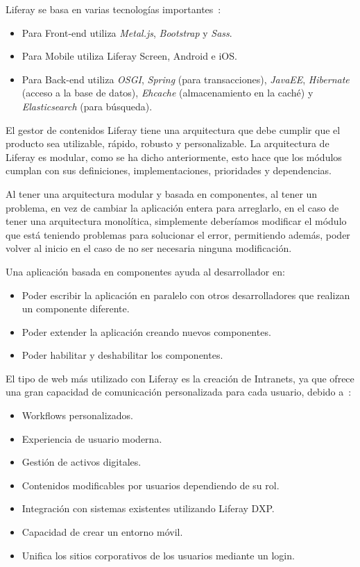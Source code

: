 \documentclass[a4paper, 12pt]{book}
\begin{document}
\vspace{5mm}
Liferay se basa en varias tecnologías importantes~\cite{liferay_dev_tutorials}:

\begin{itemize}
\item Para Front-end utiliza\textit{ Metal.js}, \textit{Bootstrap} y \textit{Sass}.
\item Para Mobile utiliza Liferay Screen, Android e iOS.
\item Para Back-end utiliza \textit{OSGI}, \textit{Spring} (para transacciones), \textit{JavaEE}, \textit{Hibernate} (acceso a la base de datos), \textit{Ehcache} (almacenamiento en la caché) y \textit{Elasticsearch} (para búsqueda).
\end{itemize}

\vspace{5mm}
El gestor de contenidos Liferay tiene una arquitectura que debe cumplir que el producto sea utilizable, rápido, robusto y personalizable. La arquitectura de Liferay es modular, como se ha dicho anteriormente, esto hace que los módulos cumplan con sus definiciones, implementaciones, prioridades y dependencias.

Al tener una arquitectura modular y basada en componentes, al tener un problema, en vez de cambiar la aplicación entera para arreglarlo, en el caso de tener una arquitectura monolítica, simplemente deberíamos modificar el módulo que está teniendo problemas para solucionar el error, permitiendo además, poder volver al inicio en el caso de no ser necesaria ninguna modificación.

Una aplicación basada en componentes ayuda al desarrollador en:
\begin{itemize}
\item Poder escribir la aplicación en paralelo con otros desarrolladores que realizan un componente diferente.
\item Poder extender la aplicación creando nuevos componentes.
\item Poder habilitar y deshabilitar los componentes.
\end{itemize}

\vspace{5mm}
El tipo de web más utilizado con Liferay es la creación de Intranets, ya que ofrece una gran capacidad de comunicación personalizada para cada usuario, debido a~\cite{liferay_intranets}:

\begin{itemize}
\item Workflows personalizados.
\item Experiencia de usuario moderna.
\item Gestión de activos digitales.
\item Contenidos modificables por usuarios dependiendo de su rol.
\item Integración con sistemas existentes utilizando Liferay DXP.
\item Capacidad de crear un entorno móvil.
\item Unifica los sitios corporativos de los usuarios mediante un login.
\end{itemize}
\end{document}
